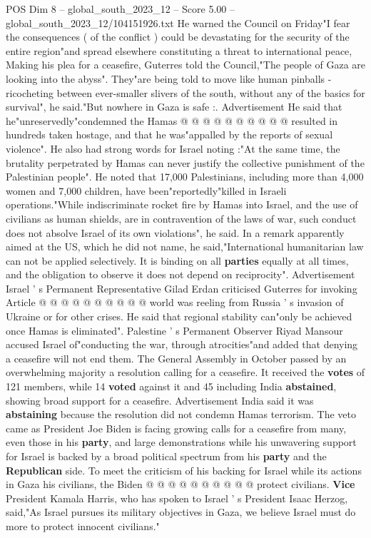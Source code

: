 \begin{textsample}{POS Dim 8 – global\_south\_2023\_12 – Score 5.00 – global\_south\_2023\_12/104151926.txt}
He warned the Council on Friday"I fear the consequences ( of the conflict ) could be devastating for the security of the entire region"and spread elsewhere constituting a threat to international peace, Making his plea for a ceasefire, Guterres told the Council,"The people of Gaza are looking into the abyss".
They"are being told to move like human pinballs - ricocheting between ever-smaller slivers of the south, without any of the basics for survival", he said."But nowhere in Gaza is safe :.
Advertisement He said that he"unreservedly"condemned the Hamas @ @ @ @ @ @ @ @ @ @ resulted in hundreds taken hostage, and that he was"appalled by the reports of sexual violence".
He also had strong words for Israel noting :"At the same time, the brutality perpetrated by Hamas can never justify the collective punishment of the Palestinian people".
He noted that 17,000 Palestinians, including more than 4,000 women and 7,000 children, have been"reportedly"killed in Israeli operations."While indiscriminate rocket fire by Hamas into Israel, and the use of civilians as human shields, are in contravention of the laws of war, such conduct does not absolve Israel of its own violations", he said.
In a remark apparently aimed at the US, which he did not name, he said,"International humanitarian law can not be applied selectively.
It is binding on all \textbf{parties} equally at all times, and the obligation to observe it does not depend on reciprocity".
Advertisement Israel ' s Permanent Representative Gilad Erdan criticised Guterres for invoking Article @ @ @ @ @ @ @ @ @ @ world was reeling from Russia ' s invasion of Ukraine or for other crises.
He said that regional stability can"only be achieved once Hamas is eliminated".
Palestine ' s Permanent Observer Riyad Mansour accused Israel of"conducting the war, through atrocities"and added that denying a ceasefire will not end them.
The General Assembly in October passed by an overwhelming majority a resolution calling for a ceasefire.
It received the \textbf{votes} of 121 members, while 14 \textbf{voted} against it and 45 including India \textbf{abstained}, showing broad support for a ceasefire.
Advertisement India said it was \textbf{abstaining} because the resolution did not condemn Hamas terrorism.
The veto came as President Joe Biden is facing growing calls for a ceasefire from many, even those in his \textbf{party}, and large demonstrations while his unwavering support for Israel is backed by a broad political spectrum from his \textbf{party} and the \textbf{Republican} side.
To meet the criticism of his backing for Israel while its actions in Gaza his civilians, the Biden @ @ @ @ @ @ @ @ @ @ protect civilians. \textbf{Vice} President Kamala Harris, who has spoken to Israel ' s President Isaac Herzog, said,"As Israel pursues its military objectives in Gaza, we believe Israel must do more to protect innocent civilians."

\end{textsample}

